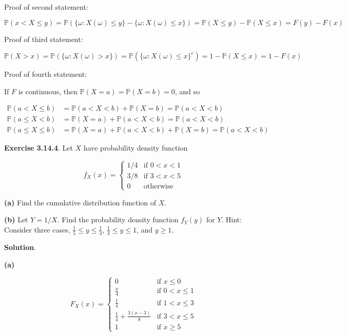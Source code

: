 Proof of second statement:

\[ \mathbb{P}(x < X \leq y) = \mathbb{P}(\{\omega : X(\omega) \leq y\} - \{\omega : X(\omega) \leq x\}) = \mathbb{P}(X \leq y) - \mathbb{P}(X \leq x) = F(y) - F(x) \]

Proof of third statement:

\[ \mathbb{P}(X > x) = \mathbb{P}(\{\omega: X(\omega) > x\}) = \mathbb{P}(\{\omega: X(\omega) \leq x\}^c) = 1 - \mathbb{P}(X \leq x) = 1 - F(x) \]

Proof of fourth statement:

If \(F\) is continuous, then
\(\mathbb{P}(X = a) = \mathbb{P}(X = b) = 0\), and so

\begin{align}
\mathbb{P}(a < X \leq b) &= \mathbb{P}(a < X < b) + \mathbb{P}(X = b) = \mathbb{P}(a < X < b) \\
\mathbb{P}(a \leq X < b) &= \mathbb{P}(X = a) + \mathbb{P}(a < X < b) = \mathbb{P}(a < X < b) \\
\mathbb{P}(a \leq X \leq b) &= \mathbb{P}(X = a) + \mathbb{P}(a < X < b) + \mathbb{P}(X = b) = \mathbb{P}(a < X < b)
\end{align}

\textbf{Exercise 3.14.4}. Let \(X\) have probability density function

\[ f_X(x) = \begin{cases}
1/4 &\text{if } 0 < x < 1 \\
3/8 &\text{if } 3 < x < 5 \\
0   &\text{otherwise}
\end{cases} \]

\textbf{(a)} Find the cumulative distribution function of \(X\).

\textbf{(b)} Let \(Y = 1 / X\). Find the probability density function
\(f_Y(y)\) for \(Y\). Hint: Consider three cases,
\(\frac{1}{5} \leq y \leq \frac{1}{3}\), \(\frac{1}{3} \leq y \leq 1\),
and \(y \geq 1\).

\textbf{Solution}.

\textbf{(a)}

\[ 
F_X(x) = \begin{cases}
0 &\text{if } x \leq 0 \\
\frac{x}{4} &\text{if } 0 < x \leq 1 \\
\frac{1}{4} &\text{if } 1 < x \leq 3 \\
\frac{1}{4} + \frac{3(x - 3)}{8} &\text{if } 3 < x \leq 5 \\
1 &\text{if } x \geq 5
\end{cases} 
\]

